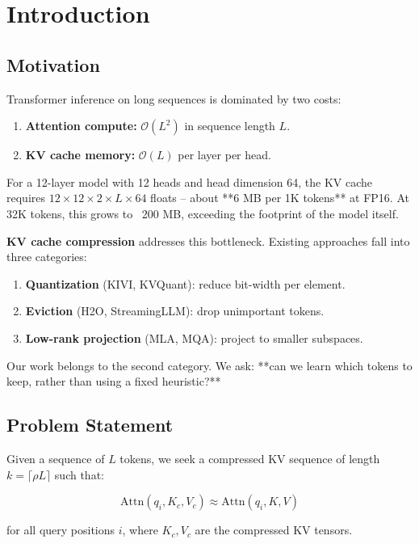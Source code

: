 \section{Introduction}

\subsection{Motivation}

Transformer inference on long sequences is dominated by two costs:

\begin{enumerate}
\item \textbf{Attention compute:} $\mathcal{O}(L^2)$ in sequence length $L$.
\item \textbf{KV cache memory:} $\mathcal{O}(L)$ per layer per head.

\end{enumerate}
For a 12-layer model with 12 heads and head dimension 64, the KV cache 
requires $12 \times 12 \times 2 \times L \times 64$ floats -- about **6 MB 
per 1K tokens** at FP16. At 32K tokens, this grows to ~200 MB, exceeding 
the footprint of the model itself.

\textbf{KV cache compression} addresses this bottleneck. Existing approaches fall 
into three categories:

\begin{enumerate}
\item \textbf{Quantization} (KIVI, KVQuant): reduce bit-width per element.
\item \textbf{Eviction} (H2O, StreamingLLM): drop unimportant tokens.
\item \textbf{Low-rank projection} (MLA, MQA): project to smaller subspaces.

\end{enumerate}
Our work belongs to the second category. We ask: **can we learn which tokens 
to keep, rather than using a fixed heuristic?**

\subsection{Problem Statement}

Given a sequence of $L$ tokens, we seek a compressed KV sequence of length 
$k = \lceil \rho L \rceil$ such that:

\[
\text{Attn}(q_i, K_c, V_c) \approx \text{Attn}(q_i, K, V)
\tag{1.1}
\]

for all query positions $i$, where $K_c, V_c$ are the compressed KV tensors.

